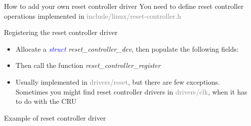 \documentclass{beamer}
\begin{document}
\begin{frame}{How to add your own reset controller driver}
	You need to define reset controller operations implemented in \textcolor{gray}{include/linux/reset-controller.h}
	
\end{frame}


\begin{frame}{Registering the reset controller driver}
	\begin{itemize}
		\item Allocate a \textit{\textcolor{blue}{struct} reset\_controller\_dev}, then populate the following fields:
		
		\item Then call the function \textit{reset\_controller\_register}
		\item Usually implemented in \textcolor{gray}{drivers/reset}, but there are few exceptions. Sometimes you might find reset controller drivers in \textcolor{gray}{drivers/clk}, when it has to do with the CRU
	\end{itemize}
\end{frame}

\begin{frame}{Example of reset controller driver}
	
\end{frame}
\end{document}
